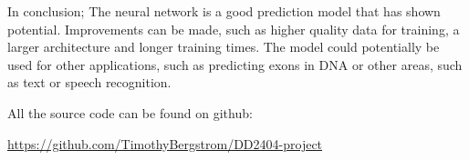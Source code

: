 In conclusion; The neural network is a good prediction model that has shown potential. Improvements can be made, such as higher quality data for training, a larger architecture and longer training times. The model could potentially be used for other applications, such as predicting exons in DNA or other areas, such as text or speech recognition.
\newline

All the source code can be found on github:

\url{https://github.com/TimothyBergstrom/DD2404-project}



\newpage

